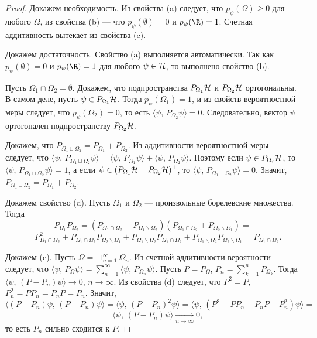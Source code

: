 \documentclass[a4paper
]{article}
\begin{document}
\begin{proof}
Докажем необходимость. Из свойства (a) следует, что $p_\psi(\Omega)\ge 0$
для любого $\Omega$, из свойства (b) --- что $p_\psi(\emptyset)=0$
и $p_\psi(\R)=1$. Счетная аддитивность вытекает из свойства (c). \par
Докажем достаточность. Свойство (a) выполняется автоматически. Так как
$p_\psi(\emptyset)=0$ и $p_\psi(\R)=1$ для любого $\psi\in {\cal H}$,
то выполнено свойство (b). \par
Пусть $\Omega_1\cap \Omega_2=\emptyset$. Докажем, что подпространства
$P_{\Omega_1}{\cal H}$ и $P_{\Omega_2}{\cal H}$ ортогональны.
В самом деле, пусть $\psi\in P_{\Omega_1}{\cal H}$. Тогда $p_\psi(\Omega_1)
=1$, и из свойств вероятностной меры следует, что $p_\psi(\Omega_2)=0$,
то есть $\langle \psi, \, P_{\Omega_2}\psi\rangle=0$. Следовательно,
вектор $\psi$ ортогонален подпространству $P_{\Omega_2}{\cal H}$. \par
Докажем, что $P_{\Omega_1\sqcup\Omega_2}=P_{\Omega_1}+P_{\Omega_2}$.
Из аддитивности вероятностной меры следует, что $\langle \psi, \,
P_{\Omega_1\sqcup \Omega_2}\psi\rangle=\langle \psi, \, P_{\Omega_1}\psi
\rangle+\langle \psi, \, P_{\Omega_2}\psi\rangle$. Поэтому если $\psi\in
P_{\Omega_j}{\cal H}$, то $\langle \psi, \, P_{\Omega_1\sqcup \Omega_2}\psi
\rangle=1$, а если $\psi\in (P_{\Omega_1}{\cal H}+P_{\Omega_2}{\cal H})
^{\bot}$, то $\langle \psi, \, P_{\Omega_1\sqcup \Omega_2}\psi\rangle=0$.
Значит, $P_{\Omega_1\sqcup \Omega_2}=P_{\Omega_1}+P_{\Omega_2}$. \par
Докажем свойство (d). Пусть $\Omega_1$ и $\Omega_2$ --- произвольные
борелевские множества. Тогда $$P_{\Omega_1}P_{\Omega_2}=(P_{\Omega_1
\cap \Omega_2}+P_{\Omega_1\backslash \Omega_2})(P_{\Omega_1\cap \Omega_2}
+P_{\Omega_2\backslash \Omega_1})=$$ $$=P_{\Omega_1\cap \Omega_2}^2+
P_{\Omega_1\cap \Omega_2}P_{\Omega_2\backslash \Omega_1}+P_{\Omega_1
\backslash \Omega_2}P_{\Omega_1\cap \Omega_2}+P_{\Omega_1\backslash
\Omega_2}P_{\Omega_2\backslash \Omega_1}=P_{\Omega_1\cap \Omega_2}.$$ \par
Докажем (c). Пусть $\Omega=\sqcup_{n=1}^\infty \Omega_n$. Из счетной
аддитивности вероятности следует, что $\langle\psi, \, P_{\Omega}\psi
\rangle=\sum \limits_{n=1}^\infty \langle\psi, \, P_{\Omega_n}\psi\rangle$.
Пусть $P=P_{\Omega}$, $P_n=\sum \limits_{k=1}^n P_{\Omega_k}$. Тогда
$\langle\psi, \, (P-P_n)\psi\rangle\rightarrow 0$, $n\rightarrow\infty$.
Из свойства (d) следует, что $P^2=P$, $P_n^2=PP_n=P_nP=P_n$.
Значит, $$\langle (P-P_n)\psi, \, (P-P_n)\psi\rangle=\langle\psi, \, (P-P_n)^2
\psi\rangle=\langle\psi, \, (P^2-PP_n-P_nP+P_n^2)\psi\rangle=$$
$$=\langle\psi, \, (P-P_n)\psi\rangle \underset{n\rightarrow\infty}{\rightarrow} 0,$$ то
есть $P_n$ сильно сходится к $P$.
\end{proof}
\end{document}

